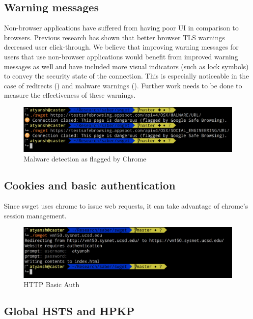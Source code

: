 \subsection{Warning messages}
Non-browser applications have suffered from having poor UI in comparison to
browsers. Previous research has shown that better browser TLS warnings
decreased user click-through. We believe that improving warning messages for
users that use non-browser applications would benefit from improved warning
messages as well and have included more visual indicators (such as lock symbols)
to convey the security state of the connection. This is especially noticeable
in the case of redirects () and malware warnings
(). Further work needs to be done to measure the
effectiveness of these warnings.

\begin{figure}[h]
  \includegraphics[width=\textwidth]{figures/malware}
  \caption{Malware detection as flagged by Chrome} 
  \label{fig:malware-saber}
\end{figure}

\subsection{Cookies and basic authentication}
Since swget uses chrome to issue web requests, it can take advantage of chrome's
session management.

\begin{figure}[h]
  \includegraphics[width=\textwidth]{figures/basic-auth}
  \caption{HTTP Basic Auth} 
  \label{fig:basic-auth-saber}
\end{figure}

\subsection{Global HSTS and HPKP}


